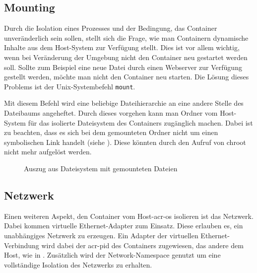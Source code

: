 \subsection{Mounting}
\label{sec:mount}
Durch die Isolation eines Prozesses und der Bedingung, das Container unveränderlich sein sollen, stellt sich die Frage, wie man Containern dynamische Inhalte aus dem Host-System zur Verfügung stellt. Dies ist vor allem wichtig, wenn bei Veränderung der Umgebung nicht den Container neu gestartet werden soll. Sollte zum Beispiel eine neue Datei durch einen Webserver zur Verfügung gestellt werden, möchte man nicht den Container neu starten. Die Lösung dieses Problems ist der Unix-Systembefehl \texttt{mount}. 

Mit diesem Befehl wird eine beliebige Dateihierarchie an eine andere Stelle des Dateibaums angeheftet. Durch dieses vorgehen kann man Ordner vom Host-System  für das isolierte Dateisystem des Containers zugänglich machen. Dabei ist zu beachten, dass es sich bei dem gemounteten Ordner nicht um einen symbolischen Link handelt (siehe ). Diese könnten durch den Aufruf von chroot nicht mehr aufgelöst werden.

\begin{figure}[h]
	\centering
	\begin{minipage}{0.9\textwidth}
	\end{minipage}
	\caption{Auszug aus Dateisystem mit gemounteten Dateien}
	\label{fig:mountExample}
\end{figure}

\subsection{Netzwerk}
\label{sec:netzwerk}

Einen weiteren Aspekt, den Container vom Host-\gls{acr-os} isolieren ist das Netzwerk. Dabei kommen virtuelle Ethernet-Adapter zum Einsatz. Diese erlauben es, ein unabhängiges Netzwerk zu erzeugen. Ein Adapter der virtuellen Ethernet-Verbindung wird dabei der \gls{acr-pid} des Containers zugewiesen, das andere dem Host, wie in . Zusätzlich wird der Network-Namespace genutzt um eine vollständige Isolation des Netzwerks zu erhalten.

